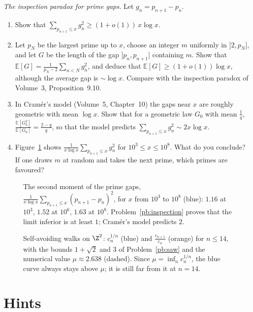 \begin{exercise}[$\star\star$]\label{pb:inspection}
\emph{The inspection paradox for prime gaps.} Let $g_n=p_{n+1}-p_n$.
\begin{enumerate}[label=(\alph*)]
\item Show that $\sum_{p_{n+1}\le x}g_n^2\ge(1+o(1))\,x\log x$.
\item Let $p_N$ be the largest prime up to $x$, choose an integer $m$ uniformly in $]2,p_N]$, and let $G$ be the length of the gap $]p_n,p_{n+1}]$ containing $m$. Show that
$\mathbb E[G]=\frac1{p_N-2}\sum_{n<N}g_n^2$, and deduce that $\mathbb E[G]\ge(1+o(1))\log x$, although the average gap is $\sim\log x$. Compare with the inspection paradox
of Volume~3, Proposition~9.10.
\item In Cram\'er's model (Volume~5, Chapter~10) the gaps near $x$ are roughly geometric with mean $\log x$. Show that for a geometric law $G_0$ with mean $\frac1q$,
$\frac{\mathbb E[G_0^2]}{\mathbb E[G_0]}=\frac{2-q}q$, so that the model predicts $\sum_{p_{n+1}\le x}g_n^2\sim2x\log x$.
\item Figure~\ref{fig:gaps} shows $\frac1{x\log x}\sum_{p_{n+1}\le x}g_n^2$ for $10^3\le x\le10^8$. What do you conclude? If one draws $m$ at random and takes the next prime,
which primes are favoured?
\end{enumerate}
\end{exercise}

\begin{figure}[ht]
\centering
{}
\caption{The second moment of the prime gaps, $\frac1{x\log x}\sum_{p_{n+1}\le x}(p_{n+1}-p_n)^2$, for $x$ from $10^3$ to $10^8$ (blue): $1.16$ at $10^3$, $1.52$ at $10^6$,
$1.63$ at $10^8$. Problem~\ref{pb:inspection} proves that the limit inferior is at least $1$; Cram\'er's model predicts $2$.}
\label{fig:gaps}
\end{figure}

\begin{figure}[ht]
\centering
{}
\caption{Self-avoiding walks on $\Z^2$: $c_n^{1/n}$ (blue) and $\frac{c_{n+1}}{c_n}$ (orange) for $n\le14$, with the bounds $1+\sqrt2$ and $3$ of Problem~\ref{pb:saw} and the
numerical value $\mu\approx2.638$ (dashed). Since $\mu=\inf_nc_n^{1/n}$, the blue curve always stays above $\mu$; it is still far from it at $n=14$.}
\label{fig:saw}
\end{figure}

\section{Hints}

